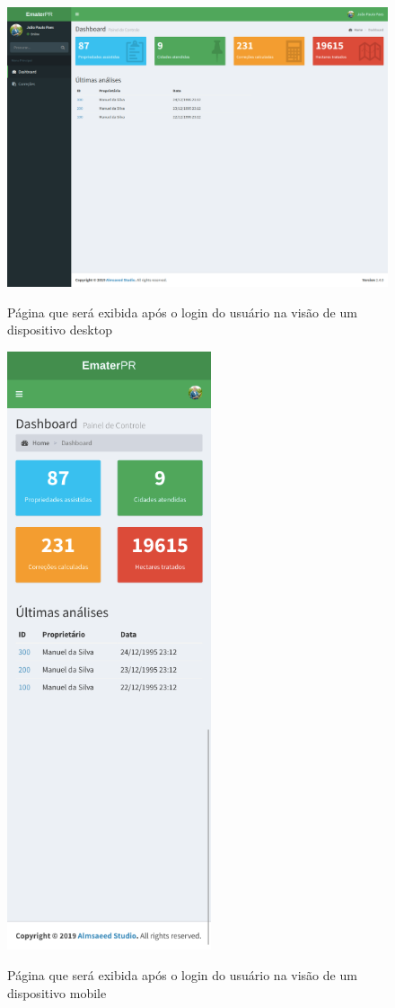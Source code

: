 \begin{figure}[H]
    \centering
    \caption{Página que será exibida após o login do usuário na visão de um dispositivo desktop}
    \includegraphics[width=13cm]{./dados/figuras/prototipos/home_desktop.png}
    \label{fig:prototipo_home_desk}
\end{figure}

\begin{figure}[H]
    \centering
    \caption{Página que será exibida após o login do usuário na visão de um dispositivo mobile}
    \includegraphics[width=6cm]{./dados/figuras/prototipos/home_mobile.png}
    \label{fig:prototipo_home_mobile}
\end{figure}

